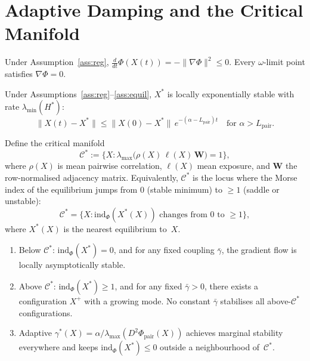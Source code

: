 \documentclass[final]{siamltex}
\newcommand{\norm}[1]{\lVert #1 \rVert}
\providecommand{\grad}{\nabla}
\newcommand{\Cman}{\mathcal{C}^*}
\newcommand{\Xst}{X^*}
\newcommand{\Lpair}{L_{\mathrm{pair}}}
\newcommand{\lmin}{\lambda_{\min}}
\newcommand{\lmax}{\lambda_{\max}}
\newcommand{\ddt}{\tfrac{d}{dt}}
\begin{document}
\section{Adaptive Damping and the Critical
Manifold}\label{sec:damping}

\begin{theorem}\label{thm:descent}
Under Assumption~\ref{ass:reg}, $\ddt\Phi(X(t))=
-\norm{\grad\Phi}^2\le 0$. Every $\omega$-limit point satisfies
$\grad\Phi=0$.
\end{theorem}

\begin{theorem}\label{thm:las}
Under Assumptions~\ref{ass:reg}--\ref{ass:equil}, $\Xst$ is
locally exponentially stable with rate $\lmin(H^*)$:
\[
  \norm{X(t)-\Xst}\le\norm{X(0)-\Xst}\,e^{-(\alpha-\Lpair)t}
  \quad\text{for }\alpha>\Lpair.
\]
\end{theorem}

\begin{theorem}\label{thm:phase}
Define the critical manifold
\begin{equation}\label{eq:cman}
  \Cman := \bigl\{X : \lmax\bigl(\rho(X)\,\ell(X)\,
  \mathbf{W}\bigr) = 1\bigr\},
\end{equation}
where $\rho(X)$ is mean pairwise correlation, $\ell(X)$ mean
exposure, and $\mathbf{W}$ the row-normalised adjacency matrix.
Equivalently, $\Cman$ is the locus where the Morse index of the
equilibrium jumps from $0$ (stable minimum) to $\ge 1$ (saddle
or unstable):
\begin{equation}\label{eq:cman_morse}
  \Cman = \bigl\{X : \mathrm{ind}_\Phi(X^*(X)) \text{ changes
  from } 0 \text{ to } \ge 1\bigr\},
\end{equation}
where $X^*(X)$ is the nearest equilibrium to~$X$.
\begin{enumerate}
\item[\textup{(i)}] Below $\Cman$: $\mathrm{ind}_\Phi(\Xst)=0$,
  and for any fixed coupling $\bar{\gamma}$, the gradient flow is
  locally asymptotically stable.
\item[\textup{(ii)}] Above $\Cman$: $\mathrm{ind}_\Phi(\Xst)\ge 1$,
  and for any fixed $\bar{\gamma}>0$, there exists a configuration
  $X^+$ with a growing mode. No constant $\bar{\gamma}$ stabilises
  all above-$\Cman$ configurations.
\item[\textup{(iii)}] Adaptive $\gamma^*(X)=\alpha/
  \lmax(D^2\Phi_{\mathrm{pair}}(X))$ achieves marginal stability
  everywhere and keeps $\mathrm{ind}_\Phi(\Xst)\le 0$ outside a
  neighbourhood of~$\Cman$.
\end{enumerate}
\end{theorem}
\end{document}
